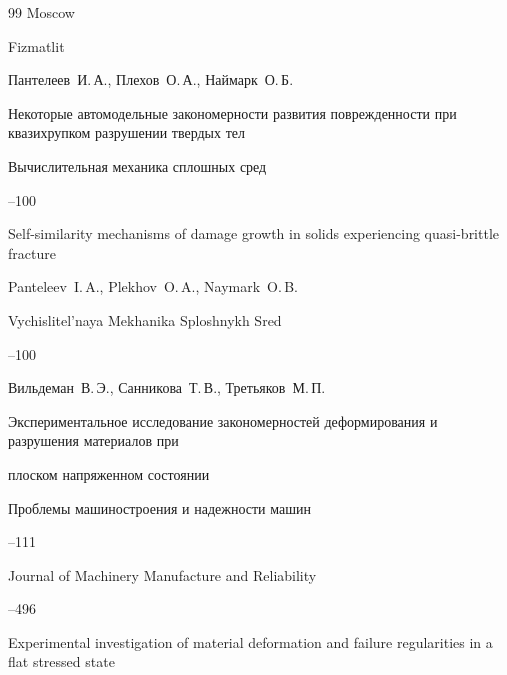 \begin{thebibliography}{99}
\publaddr Moscow

\publ  Fizmatlit










\by Пантелеев~И.\,А., Плехов~О.\,А., Наймарк~О.\,Б.

\paper Некоторые автомодельные закономерности развития поврежденности при квазихрупком разрушении твердых тел

\jour Вычислительная механика сплошных сред




--100


\misctransl

\paper Self-similarity mechanisms of damage growth in solids experiencing quasi-brittle fracture 

\by Panteleev~I.\,A., Plekhov~O.\,A., Naymark~O.\,B.

\jour Vychislitel'naya Mekhanika Sploshnykh Sred




--100




\by Вильдеман~В.\,Э., Санникова~Т.\,В., Третьяков~М.\,П.

\paper Экспериментальное исследование закономерностей деформирования и разрушения материалов при

 плоском напряженном состоянии

\jour Проблемы машиностроения и надежности машин



--111

\transl

\jour Journal of Machinery Manufacture and Reliability



--496

\paper Experimental investigation of material deformation and failure regularities in a flat stressed state


\end{thebibliography}
